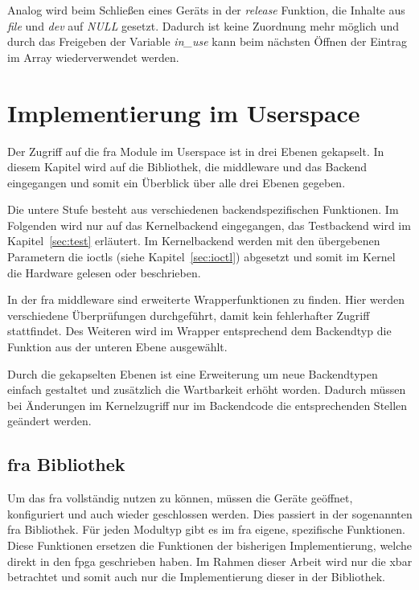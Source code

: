 Analog wird beim Schließen eines Geräts in der \textit{release} Funktion, die Inhalte aus \textit{file} und \textit{dev} auf \textit{NULL} gesetzt. Dadurch ist keine Zuordnung mehr möglich und durch das Freigeben der Variable \textit{in\_use} kann beim nächsten Öffnen der Eintrag im Array wiederverwendet werden.


\section{Implementierung im Userspace}\label{sec:user}
Der Zugriff auf die \ac{fra} Module im Userspace ist in drei Ebenen gekapselt. In diesem Kapitel wird auf die Bibliothek, die \gls{middleware} und das Backend eingegangen und somit ein Überblick über alle drei Ebenen gegeben.


Die untere Stufe besteht aus verschiedenen backendspezifischen Funktionen. Im Folgenden wird nur auf das Kernelbackend eingegangen, das Testbackend wird im Kapitel~\ref{sec:test} erläutert. Im Kernelbackend werden mit den übergebenen Parametern die \ac{ioctl}s (siehe Kapitel~\ref{sec:ioctl}) abgesetzt und somit im Kernel die Hardware gelesen oder beschrieben.

In der \ac{fra} \gls{middleware} sind erweiterte Wrapperfunktionen zu finden. Hier werden verschiedene Überprüfungen durchgeführt, damit kein fehlerhafter Zugriff stattfindet. Des Weiteren wird im Wrapper entsprechend dem Backendtyp die Funktion aus der unteren Ebene ausgewählt. 


Durch die gekapselten Ebenen ist eine Erweiterung um neue Backendtypen einfach gestaltet und zusätzlich die Wartbarkeit erhöht worden. 
Dadurch müssen bei Änderungen im Kernelzugriff nur im Backendcode die entsprechenden Stellen geändert werden.\\

\subsection{\acs{fra} Bibliothek}
Um das \ac{fra} vollständig nutzen zu können, müssen die Geräte geöffnet, konfiguriert und auch wieder geschlossen werden. Dies passiert in der sogenannten \ac{fra} Bibliothek. 
Für jeden Modultyp gibt es im \ac{fra} eigene, spezifische Funktionen. Diese Funktionen ersetzen die Funktionen der bisherigen Implementierung, welche direkt in den \ac{fpga} geschrieben haben. Im Rahmen dieser Arbeit wird nur die \ac{xbar} betrachtet und somit auch nur die Implementierung dieser in der Bibliothek.

